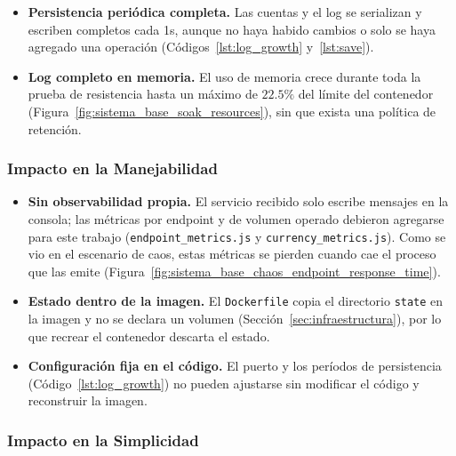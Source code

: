         \begin{itemize}
            \item \textbf{Persistencia periódica completa.} Las cuentas y el log se
            serializan y escriben completos cada 1s, aunque no haya habido cambios o
            solo se haya agregado una operación (Códigos~\ref{lst:log_growth} y~\ref{lst:save}).
            \item \textbf{Log completo en memoria.} El uso de memoria crece durante toda la
            prueba de resistencia hasta un máximo de $22.5\%$ del límite del contenedor
            (Figura~\ref{fig:sistema_base_soak_resources}), sin que exista una política de
            retención.
        \end{itemize}

        \subsubsection{Impacto en la Manejabilidad}
        \label{sec:impacto_en_la_manejabilidad}

        \begin{itemize}
            \item \textbf{Sin observabilidad propia.} El servicio recibido solo escribe
            mensajes en la consola; las métricas por endpoint y de volumen operado debieron
            agregarse para este trabajo (\texttt{endpoint\_metrics.js} y
            \texttt{currency\_metrics.js}). Como se vio en el escenario de caos, estas
            métricas se pierden cuando cae el proceso que las emite
            (Figura~\ref{fig:sistema_base_chaos_endpoint_response_time}).
            \item \textbf{Estado dentro de la imagen.} El \texttt{Dockerfile} copia el
            directorio \texttt{state} en la imagen y no se declara un volumen
            (Sección~\ref{sec:infraestructura}), por lo que recrear el contenedor descarta
            el estado.
            \item \textbf{Configuración fija en el código.} El puerto y los períodos de
            persistencia (Código~\ref{lst:log_growth}) no pueden ajustarse sin modificar el código y reconstruir la imagen.
        \end{itemize}

        \subsubsection{Impacto en la Simplicidad}
        \label{sec:impacto_en_la_simplicidad}


